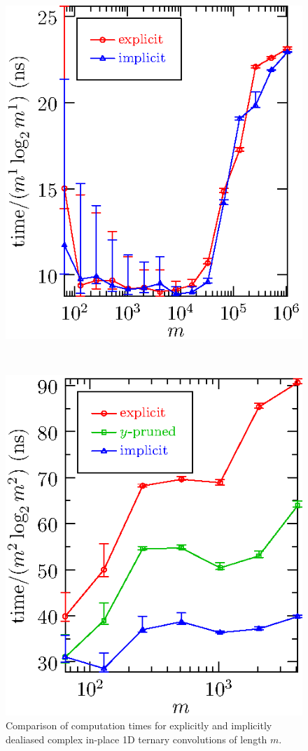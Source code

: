 \documentclass[final]{siamltex}
\begin{document}
\begin{figure}[htbp]
\begin{minipage}{0.49\linewidth}
\begin{center}
\includegraphics{timing1b}
\caption{Comparison of computation times for explicitly and implicitly
dealiased complex in-place 1D ternary convolutions of length $m$.}
\label{timing1b}
\end{center}
\end{minipage}
\,
\begin{minipage}{0.49\linewidth}
\begin{center}
\includegraphics{timing2b}

\end{center}
\end{minipage}
\end{figure}
\end{document}
